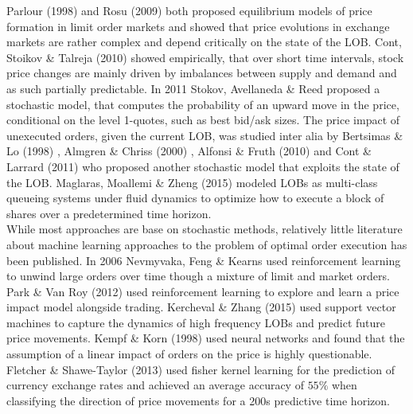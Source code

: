 Parlour (1998) \Cite{PriceDynamicsinLimitOrderMarkets} and Rosu (2009) \Cite{Rosu:adynamic} both proposed equilibrium models of price formation in limit order markets and showed that price evolutions in exchange markets are rather complex and depend critically on the state of the \ac{LOB}. Cont, Stoikov \& Talreja (2010) \Cite{Cont10theprice} showed empirically, that over short time intervals, stock price changes are mainly driven by imbalances between supply and demand and as such partially predictable. In 2011 Stokov, Avellaneda \& Reed \Cite{Stoikov10contents} proposed a stochastic model, that computes the probability of an upward move in the price, conditional on the level 1-quotes, such as best bid/ask sizes. The price impact of unexecuted orders, given the current \ac{LOB}, was studied inter alia by Bertsimas \& Lo (1998) \Cite{bertsimas1998:optimalControl}, Almgren \& Chriss (2000) \Cite{almgren2000:optimalExecution}, Alfonsi \& Fruth (2010) \Cite{alfonsi2009:optimalExecutionStrategies} and Cont \& Larrard (2011) \Cite{Cont:pricedynamics} who proposed another stochastic model that exploits the state of the \ac{LOB}. Maglaras, Moallemi \& Zheng (2015) \Cite{optimalExecutionInALimitOrderBook} modeled \ac{LOB}s as multi-class queueing systems under fluid dynamics to optimize how to execute a block of shares over a predetermined time horizon.\\

While most approaches are base on stochastic methods, relatively little literature about machine learning approaches to the problem of optimal order execution has been published. In 2006 Nevmyvaka, Feng \& Kearns \Cite{Nevmyvaka:2006} used reinforcement learning to unwind large orders over time though a mixture of limit and market orders. Park \& Van Roy (2012) \Cite{2012arXiv1207.6423P} used reinforcement learning to explore and learn a price impact model alongside trading. Kercheval \& Zhang (2015) \Cite{modellingHighFrequencyLOBdynamicsSVM} used support vector machines to capture the dynamics of high frequency \ac{LOB}s and predict future price movements. Kempf \& Korn (1998) \Cite{marketDepthOrderSizeNN} used neural networks and found that the assumption of a linear impact of orders on the price is highly questionable. Fletcher \& Shawe-Taylor (2013) \Cite{Fletcher2013} used fisher kernel learning for the prediction of currency exchange rates and achieved an average accuracy of $55\%$ when classifying the direction of price movements for a 200s predictive time horizon.\\

